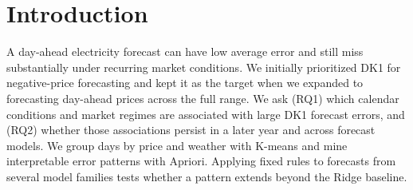 \section{Introduction}
A day-ahead electricity forecast can have low average error and still
miss substantially under recurring market conditions. We initially
prioritized DK1 for negative-price forecasting and kept it as the target
when we expanded to forecasting day-ahead prices across the full range.
We ask (RQ1)
which calendar conditions and market regimes are associated with large
DK1 forecast errors, and (RQ2) whether those associations persist in a
later year and across forecast models. We group days by price and weather
with K-means and mine interpretable error patterns with Apriori. Applying
fixed rules to forecasts from several model families tests whether a
pattern extends beyond the Ridge baseline.
